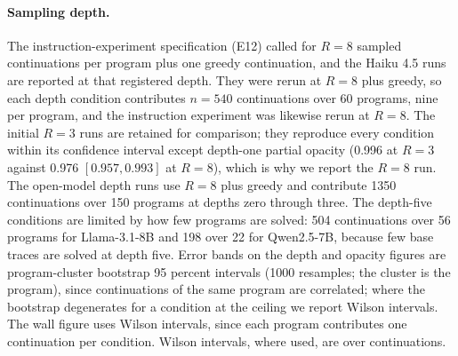 \paragraph{Sampling depth.}
The instruction-experiment specification (E12) called for $R = 8$ sampled continuations per program plus one greedy continuation, and the Haiku 4.5 runs are reported at that registered depth. They were rerun at $R = 8$ plus greedy, so each depth condition contributes $n = 540$ continuations over 60 programs, nine per program, and the instruction experiment was likewise rerun at $R = 8$. The initial $R = 3$ runs are retained for comparison; they reproduce every condition within its confidence interval except depth-one partial opacity (0.996 at $R = 3$ against 0.976 $[0.957, 0.993]$ at $R = 8$), which is why we report the $R = 8$ run.
The open-model depth runs use $R = 8$ plus greedy and contribute 1350 continuations over 150 programs at depths zero through three. The depth-five conditions are limited by how few programs are solved: 504 continuations over 56 programs for Llama-3.1-8B and 198 over 22 for Qwen2.5-7B, because few base traces are solved at depth five. Error bands on the depth and opacity figures are program-cluster bootstrap 95 percent intervals (1000 resamples; the cluster is the program), since continuations of the same program are correlated; where the bootstrap degenerates for a condition at the ceiling we report Wilson intervals. The wall figure uses Wilson intervals, since each program contributes one continuation per condition. Wilson intervals, where used, are over continuations.

